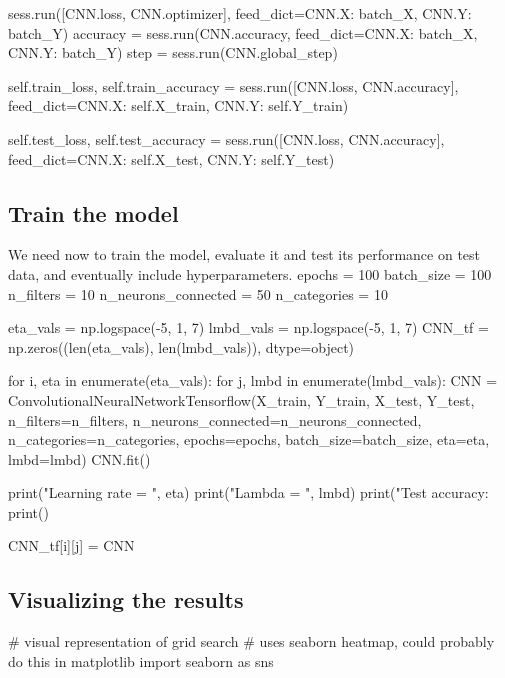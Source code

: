\documentclass[%
oneside,                 %
final,                   %
10pt]{article}
\begin{document}
                    sess.run([CNN.loss, CNN.optimizer],
                        feed_dict={CNN.X: batch_X,
                                   CNN.Y: batch_Y})
                    accuracy = sess.run(CNN.accuracy,
                        feed_dict={CNN.X: batch_X,
                                   CNN.Y: batch_Y})
                    step = sess.run(CNN.global_step)
    
            self.train_loss, self.train_accuracy = sess.run([CNN.loss, CNN.accuracy],
                feed_dict={CNN.X: self.X_train,
                           CNN.Y: self.Y_train})
        
            self.test_loss, self.test_accuracy = sess.run([CNN.loss, CNN.accuracy],
                feed_dict={CNN.X: self.X_test,
                           CNN.Y: self.Y_test})
\epycid

\subsection{Train the model}

We need now to train the model, evaluate it and test its performance on test data, and eventually include hyperparameters.
\bpycod
epochs = 100
batch_size = 100
n_filters = 10
n_neurons_connected = 50
n_categories = 10

eta_vals = np.logspace(-5, 1, 7)
lmbd_vals = np.logspace(-5, 1, 7)
CNN_tf = np.zeros((len(eta_vals), len(lmbd_vals)), dtype=object)
        
for i, eta in enumerate(eta_vals):
    for j, lmbd in enumerate(lmbd_vals):
        CNN = ConvolutionalNeuralNetworkTensorflow(X_train, Y_train, X_test, Y_test,
                                      n_filters=n_filters, n_neurons_connected=n_neurons_connected,
                                      n_categories=n_categories, epochs=epochs, batch_size=batch_size,
                                      eta=eta, lmbd=lmbd)
        CNN.fit()
        
        print("Learning rate = ", eta)
        print("Lambda = ", lmbd)
        print("Test accuracy: %
        print()
            
        CNN_tf[i][j] = CNN
\epycod

\subsection{Visualizing the results}

\bpycod
# visual representation of grid search
# uses seaborn heatmap, could probably do this in matplotlib
import seaborn as sns
\end{document}
